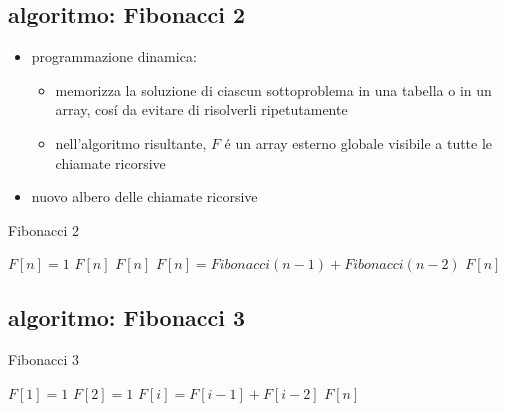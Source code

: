 \subsection*{algoritmo: Fibonacci 2}
\begin{flushleft}
	\begin{itemize}
		\item programmazione dinamica:
		\begin{itemize}
			\item memorizza la soluzione di ciascun sottoproblema in una tabella o in un array, cos\'i da evitare di risolverli ripetutamente
			\item nell'algoritmo risultante, $F$ \'e un array esterno globale visibile a tutte le chiamate ricorsive
		\end{itemize}
		\item nuovo albero delle chiamate ricorsive
	\end{itemize}
	\begin{algorithm}
		\caption{Fibonacci 2}
		\begin{algorithmic}
				\STATE $F[n]=1$
				\RETURN $F[n]$
			\ELSE
					\RETURN $F[n]$
				\ELSE
					\STATE $F[n]=Fibonacci(n-1)+Fibonacci(n-2)$
					\RETURN $F[n]$
				\ENDIF
			\ENDIF
		\end{algorithmic}
	\end{algorithm}
\end{flushleft}


\subsection*{algoritmo: Fibonacci 3}
\begin{flushleft}
	\begin{algorithm}
		\caption{Fibonacci 3}
		\begin{algorithmic}
			\STATE $F[1]=1$
			\STATE $F[2]=1$
			\FOR{$i=3$ to $n$}
				\STATE $F[i]=F[i-1]+F[i-2]$
			\ENDFOR
			\RETURN $F[n]$
		\end{algorithmic}
	\end{algorithm}
\end{flushleft}


